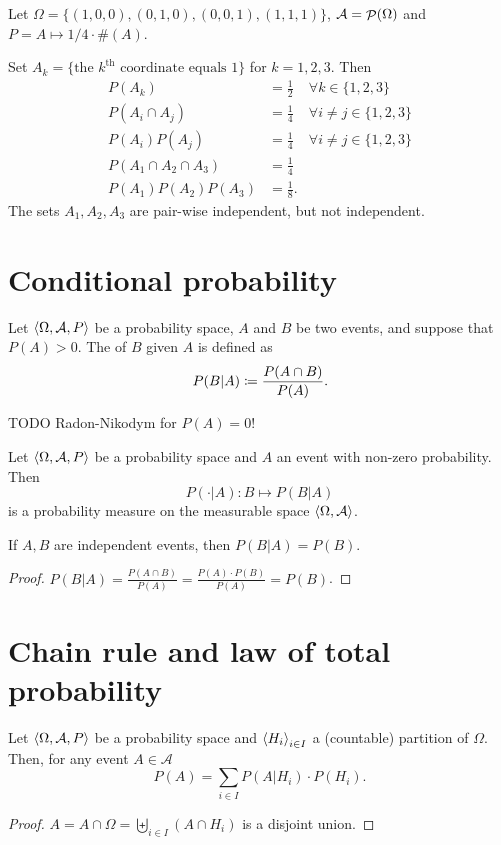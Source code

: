 \begin{example}
Let $\Omega = \{(1, 0, 0), (0, 1, 0), (0, 0, 1), (1, 1, 1)\}$, $\mathcal{A} = \mathop{\mathcal{P}}(\Omega)$ and $P = A\mapsto 1/4 \cdot \#(A)$.

Set $A_k = \{\text{the $k^\text{th}$ coordinate equals $1$}\}$ for $k=1,2,3$. Then
\begin{align*}
P(A_k) &= \frac{1}{2} & \forall k \in\{1,2,3\} \\
P(A_i\cap A_j) &= \frac{1}{4} & \forall i\neq j \in\{1,2,3\} \\
P(A_i)P(A_j) &= \frac{1}{4} & \forall i\neq j \in\{1,2,3\} \\
P(A_1\cap A_2 \cap A_3) &= \frac{1}{4} \\
P(A_1)P(A_2)P(A_3) &= \frac{1}{8}.
\end{align*}
The sets $A_1, A_2, A_3$ are pair-wise independent, but not independent.
\end{example}

\section{Conditional probability}
\begin{definition}
Let $\left\langle \Omega, \mathcal{A}, P \right\rangle$ be a probability space, $A$ and $B$ be two events, and suppose that $P(A) > 0$. The  of $B$ given $A$ is defined as
\[ P(B | A) \coloneqq \frac{P(A\cap B)}{P(A)}. \]
\end{definition}

TODO Radon-Nikodym for $P(A) = 0$!

\begin{lemma}
Let $\left\langle \Omega, \mathcal{A}, P \right\rangle$ be a probability space and $A$ an event with non-zero probability. Then
\[ P(\cdot | A): B\mapsto P(B | A) \]
is a probability measure on the measurable space $\left\langle \Omega, \mathcal{A} \right\rangle$.
\end{lemma}
\begin{lemma}
If $A,B$ are independent events, then $P(B|A) = P(B)$.
\end{lemma}
\begin{proof}
$P(B|A) = \frac{P(A\cap B)}{P(A)} = \frac{P(A)\cdot P(B)}{P(A)} = P(B)$.
\end{proof}

\section{Chain rule and law of total probability}
\begin{theorem}
Let $\left\langle \Omega, \mathcal{A}, P \right\rangle$ be a probability space and $\left\langle H_i \right\rangle_{i\in I}$ a (countable) partition of $\Omega$. Then, for any event $A\in \mathcal{A}$
\[ P(A) = \sum_{i\in I}P(A|H_i)\cdot P(H_i). \]
\end{theorem}
\begin{proof}
$A = A\cap \Omega = \biguplus_{i\in I}(A\cap H_i)$ is a disjoint union.
\end{proof}


